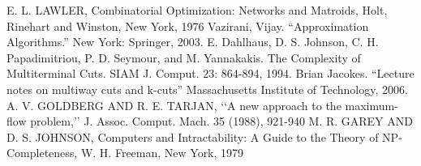\begin{thebibliography}{3}
E. L. LAWLER, Combinatorial Optimization: Networks and Matroids, Holt, Rinehart and
Winston, New York, 1976
Vazirani, Vijay. “Approximation Algorithms.” New York: Springer, 2003.
E. Dahlhaus, D. S. Johnson, C. H. Papadimitriou, P. D. Seymour, and M. Yannakakis. The
Complexity of Multiterminal Cuts. SIAM J. Comput. 23: 864-894, 1994.
Brian Jacokes. “Lecture notes on multiway cuts and k-cuts” Massachusetts Institute of Technology, 2006.
A. V. GOLDBERG AND R. E. TARJAN, ‘‘A new approach to the maximum-flow problem,’’ J.
Assoc. Comput. Mach. 35 (1988), 921-940
M. R. GAREY AND D. S. JOHNSON, Computers and Intractability: A Guide to the Theory of
NP-Completeness, W. H. Freeman, New York, 1979
\end{thebibliography}